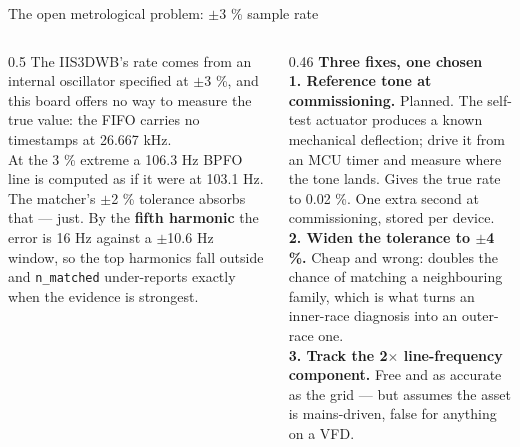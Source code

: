 \documentclass[aspectratio=169,10pt]{beamer}
\begin{document}
\begin{frame}{The open metrological problem: $\pm$3 \% sample rate}
  \begin{columns}[T]
    \begin{column}{0.5\textwidth}
      \small
      The IIS3DWB's rate comes from an internal oscillator specified at
      $\pm$3 \%, and this board offers no way to measure the true value: the
      FIFO carries no timestamps at 26.667 kHz.
      \\[2mm]
      \scriptsize
      At the 3 \% extreme a 106.3 Hz BPFO line is computed as if it were at
      103.1 Hz. The matcher's $\pm$2 \% tolerance absorbs that --- just. By the
      \textbf{fifth harmonic} the error is 16 Hz against a $\pm$10.6 Hz window,
      so the top harmonics fall outside and \texttt{n\_matched} under-reports
      exactly when the evidence is strongest.
    \end{column}
    \begin{column}{0.46\textwidth}
      \scriptsize
      \textbf{Three fixes, one chosen}
      \\[1.5mm]
      \textbf{1. Reference tone at commissioning.} \textcolor{pdmgood}{Planned.}
      The self-test actuator produces a known mechanical deflection; drive it
      from an MCU timer and measure where the tone lands. Gives the true rate to
      0.02 \%. One extra second at commissioning, stored per device.
      \\[1.5mm]
      \textbf{2. Widen the tolerance to $\pm$4 \%.} Cheap and wrong: doubles the
      chance of matching a neighbouring family, which is what turns an
      inner-race diagnosis into an outer-race one.
      \\[1.5mm]
      \textbf{3. Track the 2$\times$ line-frequency component.} Free and as
      accurate as the grid --- but assumes the asset is mains-driven, false for
      anything on a VFD.
    \end{column}
  \end{columns}
\end{frame}
\end{document}
